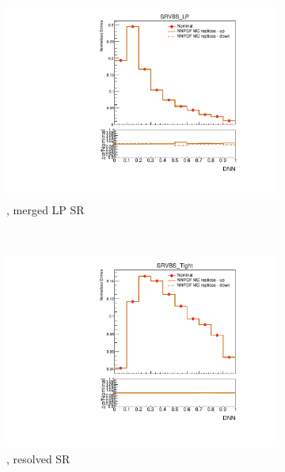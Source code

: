 \begin{figure}[ht]
\begin{subfigure}[b]{0.3\textwidth}
        \includegraphics[width=\textwidth]{figures/1lep/PDFUnc/NNPDF/W_0ptag1pfat0pjet_0ptv_SRVBS_LP_DNN_SysTheoryPDF_NNPDF_W__1up_Norm.pdf}
        \caption{\Wjets, merged LP SR}
    \end{subfigure}
    \\
    \vspace{15mm}
    \begin{subfigure}[b]{0.3\textwidth}
        \includegraphics[width=\textwidth]{figures/1lep/PDFUnc/NNPDF/ttbar_0ptag2pjet_0ptv_SRVBS_Tight_DNN_SysTheoryPDF_NNPDF_ttbar__1up_Norm.pdf}
        \caption{\ttbar, resolved SR}
    \end{subfigure}
    \begin{subfigure}[b]{0.3\textwidth}

\end{subfigure}
\end{figure}
